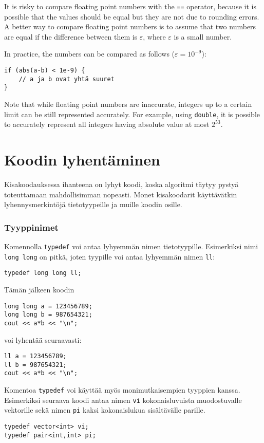 It is risky to compare floating point numbers
with the \texttt{==} operator,
because it is possible that the values should
be equal but they are not due to rounding errors.
A better way to compare floating point numbers
is to assume that two numbers are equal
if the difference between them is $\varepsilon$,
where $\varepsilon$ is a small number.

In practice, the numbers can be compared
as follows ($\varepsilon=10^{-9}$):

\begin{lstlisting}
if (abs(a-b) < 1e-9) {
    // a ja b ovat yhtä suuret
}
\end{lstlisting}

Note that while floating point numbers are inaccurate,
integers up to a certain limit can be still
represented accurately.
For example, using \texttt{double},
it is possible to accurately represent all
integers having absolute value at most $2^{53}$.

\section{Koodin lyhentäminen}

Kisakoodauksessa ihanteena on lyhyt koodi,
koska algoritmi täytyy pystyä toteuttamaan
mahdollisimman nopeasti.
Monet kisakoodarit käyttävätkin lyhennysmerkintöjä
tietotyypeille ja muille koodin osille.

\subsubsection{Tyyppinimet}
Komennolla \texttt{typedef} voi antaa lyhyemmän
nimen tietotyypille.
Esimerkiksi nimi \texttt{long long} on pitkä,
joten tyypille voi antaa lyhyemmän nimen \texttt{ll}:
\begin{lstlisting}
typedef long long ll;
\end{lstlisting}
Tämän jälkeen koodin
\begin{lstlisting}
long long a = 123456789;
long long b = 987654321;
cout << a*b << "\n";
\end{lstlisting}
voi lyhentää seuraavasti:
\begin{lstlisting}
ll a = 123456789;
ll b = 987654321;
cout << a*b << "\n";
\end{lstlisting}

Komentoa \texttt{typedef} voi käyttää myös
monimutkaisempien tyyppien kanssa.
Esimerkiksi seuraava koodi antaa nimen \texttt{vi}
kokonaisluvuista muodostuvalle vektorille
sekä nimen \texttt{pi} kaksi
kokonaislukua sisältävälle parille.
\begin{lstlisting}
typedef vector<int> vi;
typedef pair<int,int> pi;
\end{lstlisting}

